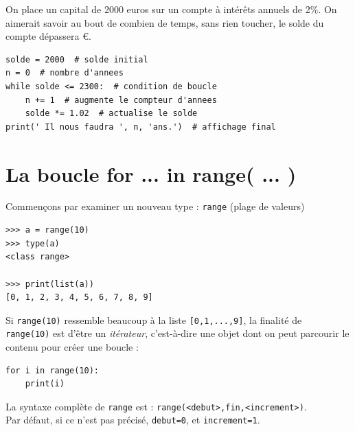 On place un capital de 2000 euros sur un compte à intérêts annuels de 2\%. On aimerait savoir au bout de combien de temps, sans rien toucher, le 
solde du compte dépassera  €.\\

\begin{pyc}
\begin{verbatim}
solde = 2000  # solde initial
n = 0  # nombre d'annees
while solde <= 2300:  # condition de boucle
    n += 1  # augmente le compteur d'annees
    solde *= 1.02  # actualise le solde
print(' Il nous faudra ', n, 'ans.')  # affichage final   
\end{verbatim}
\end{pyc}

\section{La boucle for ... in range( ... )}

Commençons par examiner un nouveau type : \texttt{range} (plage de valeurs)

\begin{pyc}
\begin{verbatim}
>>> a = range(10)
>>> type(a)
<class range>

>>> print(list(a))
[0, 1, 2, 3, 4, 5, 6, 7, 8, 9]
\end{verbatim}
\end{pyc}

Si \texttt{range(10)} ressemble beaucoup à la liste \texttt{[0,1,...,9]}, la finalité de \\\texttt{range(10)} est d'être un \textit{itérateur}, 
c'est-à-dire une objet dont on peut parcourir le contenu pour créer une boucle :

\begin{pyc}
\begin{verbatim}
for i in range(10):
    print(i)
\end{verbatim}
\end{pyc}
La syntaxe complète de \texttt{range} est : \texttt{range(<debut>,fin,<increment>)}.\\

Par défaut, si ce n'est pas précisé, \texttt{debut=0}, et \texttt{increment=1}.\\

